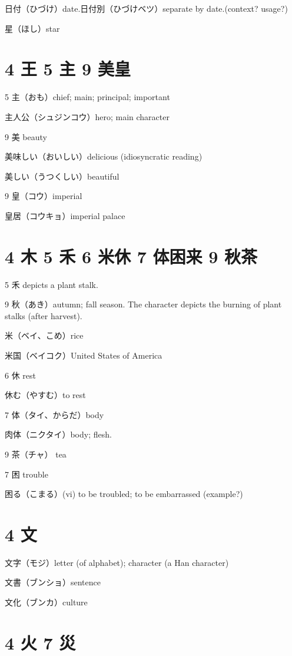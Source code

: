 日付（ひづけ）date.日付別（ひづけベツ）separate by date.(context? usage?)

星（ほし）star

\section{4 王 5 主 9 美皇}

5 主（おも）chief; main; principal; important

主人公（シュジンコウ）hero; main character

9 美 beauty

美味しい（おいしい）delicious (idiosyncratic reading)

美しい（うつくしい）beautiful

9 皇（コウ）imperial

皇居（コウキョ）imperial palace

\section{4 木 5 禾 6 米休 7 体困来 9 秋茶}

5 禾 depicts a plant stalk.

9 秋（あき）autumn; fall season.
The character depicts the burning of plant stalks (after harvest).

米（ベイ、こめ）rice

米国（ベイコク）United States of America

6 休 rest

休む（やすむ）to rest

7 体（タイ、からだ）body

肉体（ニクタイ）body; flesh.

9 茶（チャ） tea

7 困 trouble

困る（こまる）(vi) to be troubled; to be embarrassed
(example?)

\section{4 文}

文字（モジ）letter (of alphabet); character (a Han character)

文書（ブンショ）sentence

文化（ブンカ）culture

\section{4 火 7 災}

